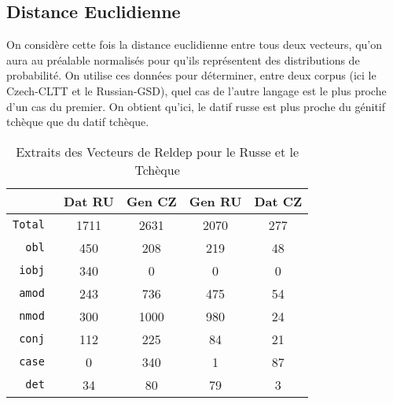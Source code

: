 \documentclass{cours}
\begin{document}
    \subsection{Distance Euclidienne}
    On considère cette fois la distance euclidienne entre tous deux vecteurs, qu'on aura au préalable normalisés pour qu'ils représentent des distributions de probabilité.
    On utilise ces données pour déterminer, entre deux corpus (ici le Czech-CLTT et le Russian-GSD), quel cas de l'autre langage est le plus proche d'un cas du premier.
    On obtient qu'ici, le datif russe est plus proche du génitif tchèque que du datif tchèque.
    \begin{table}[H]
	    \centering
    \begin{tabular}{>{\tt}r|cccc}
        \toprule
        &Dat RU & Gen CZ & Gen RU & Dat CZ\\
        \midrule
        Total & 1711 & 2631 & 2070 & 277\\
        obl & 450 & 208 & 219 & 48\\
        iobj & 340 & 0 & 0 & 0\\
        amod & 243 & 736 & 475 & 54\\
        nmod & 300 & 1000 & 980 & 24\\
        conj & 112 & 225 & 84 & 21\\
        case & 0 & 340 & 1 & 87\\
        det & 34 & 80 & 79 & 3\\
        \bottomrule
    \end{tabular}
	\caption{Extraits des Vecteurs de Reldep pour le Russe et le Tchèque}
    \end{table}
\end{document}
